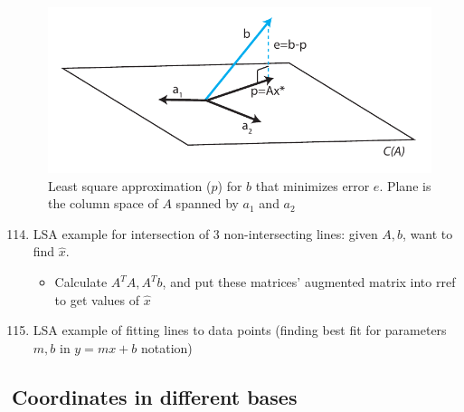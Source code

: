 \documentclass[10pt,letterpaper]{article}
\begin{document}
 \begin{figure}[htb]
 \centering
 \includegraphics[width=12cm]{./least-squares.pdf}
 \caption{\label{fig:lsa}Least square approximation ($p$) for $b$ that minimizes error $e$. Plane is the column space of $A$ spanned by $a_1$ and $a_2$}
 \end{figure}
\begin{enumerate}
\setcounter{enumi}{113}
\item  LSA example for intersection of 3 non-intersecting lines: given $A, b$, want to find $\hat x$.

\begin{itemize}
\item Calculate $A ^{T} A, A ^{T} b$, and put these matrices' augmented matrix into rref to get values of $\hat x$
\end{itemize}

\item LSA example of fitting lines to data points (finding best fit for parameters $m,b$ in $y=mx+b$ notation)
\end{enumerate}
\subsection{Coordinates in different bases}
\label{sec-1_9}
\end{document}
